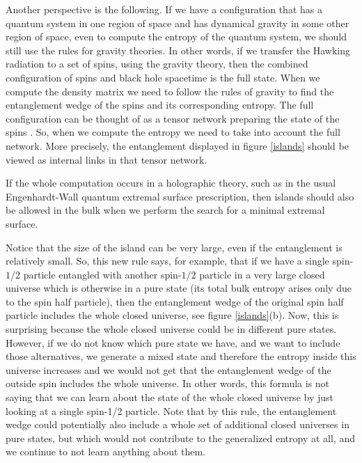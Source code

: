 \documentclass[12pt]{article}
\begin{document}
Another perspective is the following. 
If we have a configuration that has a quantum system in one region of space and has dynamical gravity in some other region of space, even to compute the entropy of the quantum system, we should still use the rules for gravity theories.
In other words, if we transfer the Hawking radiation to a set of spins, using the gravity theory, then the combined configuration of spins and black hole spacetime is the full state. When we compute the density matrix we need to follow the rules of gravity to find the entanglement wedge of the spins and its corresponding entropy.
The full configuration can be thought of as a tensor network preparing the state of the spins \cite{Swingle:2009bg}\cite{Hartman:2013qma}. 
So, when we compute the entropy we need to take into account the full network. 
More precisely, the entanglement displayed in figure \ref{islands} should be viewed as internal links in that tensor network.


If the whole computation occurs in a holographic theory, such as in the usual Engenhardt-Wall \cite{Engelhardt:2014gca} quantum extremal surface prescription, then islands should also be allowed in the bulk when we perform the search for a minimal extremal surface.  


Notice that the size of the island can be very large, even if the entanglement is relatively small. 
So, this new rule says, for example, that if we have a single spin-$1/2$ particle entangled with another spin-$1/2$ particle in a very large closed universe which is otherwise in a pure state (its total bulk entropy arises only due to the spin half particle), then the entanglement wedge of the original spin half particle includes the whole closed universe, see figure \ref{islands}(b).
Now, this is surprising because the whole closed universe could be in different pure states. 
However, if we do not know which pure state we have, and we want to include those alternatives, we generate a mixed state and therefore  the entropy inside this universe increases and we would not get that the entanglement wedge of the outside spin includes the whole universe. 
In other words, this formula is not saying that we can learn about the state of the whole closed universe by just looking at a single spin-1/2 particle. 
Note that by this rule, the entanglement wedge could potentially also include a whole set of additional closed universes in pure states, but which would not contribute to the generalized entropy at all, and we continue to not learn anything about them.
\end{document}
